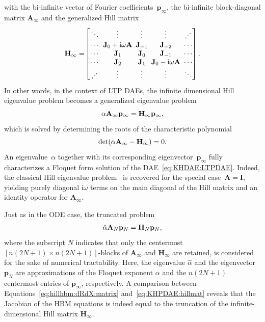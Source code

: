 \documentclass[a4paper, nonatbib, 3p, twocolumn]{elsarticle}
\theoremstyle{plain}
\theoremstyle{definition}
\theoremstyle{remark}
\newcommand{\iddots}{{}_{\boldsymbol{\cdot} \vphantom{\frac{1}{1}}} \cdot^{\boldsymbol{\cdot} \vphantom{\frac{1}{1}}}} %
\newcommand{\ic}{\ri} %
\newcommand{\ri}{\mathrm i}
\newcommand{\vp}{\mathbf p}
\newcommand{\vA}{\mathbf A}
\newcommand{\vH}{\mathbf H}
\newcommand{\vI}{\mathbf I}
\newcommand{\vJ}{\mathbf J}
\begin{document}
with the bi-infinite vector of Fourier coefficients~$\vp_\infty$, the bi-infinite block-diagonal matrix $\vA_\infty$ and the generalized Hill matrix
\begin{equation}\label{eq:KHPDAE:hillmat}
    \vH_\infty = \!\begin{bmatrix}
			\ddots &  \vdots & \vdots & \vdots & \iddots \\
			\cdots  & \!\!\!\vJ_0+\ic \omega\vA\!\!\! & \vJ_{-1} & \vJ_{-2}  & \cdots \\
			\cdots & \vJ_1 & \!\!\!\vJ_0 \!\!\!& \vJ_{-1} &  \cdots \\
			\cdots & \vJ_2 & \vJ_1 & \!\!\!\vJ_0-\ic \omega\vA \!\!\!&  \cdots \\
			\iddots &  \vdots & \vdots & \vdots & \ddots \\
	\end{bmatrix}\textnormal{.}
\end{equation}
In other words, in the context of LTP DAEs, the infinite dimensional Hill eigenvalue problem becomes a generalized eigenvalue problem
\begin{equation} \label{eq:KHPDAE:generalized}
	\alpha\vA_\infty\vp_\infty=\vH_\infty\vp_\infty\textnormal{,}
\end{equation}
which is solved by determining the roots of the characteristic polynomial
\begin{equation}
	\det(\alpha\vA_\infty-\vH_\infty)=0\textnormal{.}
\end{equation}
An eigenvalue~$\alpha$ together with its corresponding eigenvector~$\vp_\infty$ fully characterizes a Floquet form solution of the DAE~\eqref{eq:KHDAE:LTPDAE}. 
Indeed, the classical Hill eigenvalue problem~\cite{Lazarus2010} is recovered for the special case~$\vA=\vI$, yielding purely diagonal $\ic \omega $ terms on the main diagonal of the Hill matrix and an identity operator for $\vA_{\infty}$.

Just as in the ODE case, the truncated problem
\begin{equation} \label{eq:KHDAE:truncatedGeneralizedHill}
	\hat{\alpha}\vA_N\vp_N=\vH_N\vp_N\textnormal{,}
\end{equation}
where the subscript $N$ indicates that only the centermost $[n(2N+1)\times n(2N+1)]$-blocks of $\vA_\infty$ and $\vH_\infty$ are retained, is considered for the sake of numerical tractability. Here, the eigenvalue $\hat{\alpha}$ and the eigenvector~$\vp_N$ are approximations of the Floquet exponent $\alpha$ and the $n(2N+1)$ centermost entries of $\vp_\infty$, respectively.
A comparison between Equations~\eqref{eq:hillhbm:dRdX:matrix} and~\eqref{eq:KHPDAE:hillmat} reveals that the Jacobian of the HBM equations is indeed equal to the truncation of the infinite-dimensional Hill matrix $\vH_{\infty}$.
\end{document}
